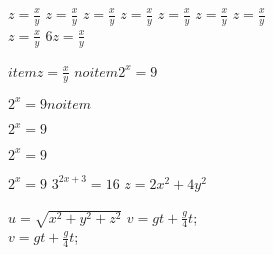 \documentclass[12pt, a4paper, oneside]{book}
\begin{document}
		\begin{tabenum}[\bfseries1)]%
		\tabenumitem 		$z=\displaystyle\frac xy$
		\tabenumitem 		$z=\displaystyle\frac xy$
		\tabenumitem 		$z=\displaystyle\frac xy$
		\tabenumitem 		$z=\displaystyle\frac xy$
		\tabenumitem 		$z=\displaystyle\frac xy$
		\tabenumitem 		$z=\displaystyle\frac xy$
		\tabenumitem 		$z=\displaystyle\frac xy$\\
		\tabenumitem 		$z=\displaystyle\frac xy$ 
		\skipitem
		\tabenumitem 		$6 z=\displaystyle\frac xy$\\	
		\item			$ item  z=\displaystyle\frac xy$
		\noitem			$ noitem 2^x=9$
		\item			$2^x=9 noitem$\cr
		\item			$2^x=9$\cr
		\item			$2^x=9$\cr
		\item			$2^x=9$\cr
		\tabenumitem		$3^{2x+3}=16 $
		\tabenumitem		$z=2x^2+4y^2$\par
		\tabenumitem		$u=\sqrt{x^2+y^2+z^2}$
		\tabenumitem		$v=gt+\displaystyle\frac{g}{4}t$;\\[1ex]
		\tabenumitem		$v=gt+\frac{g}{4}t$;\\[1ex]
		\end{tabenum}
\end{document}
